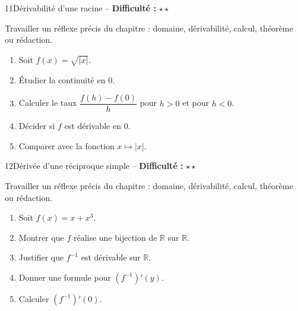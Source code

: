 \documentclass[11pt,a4paper]{article}
\newcommand{\R}{\mathbb{R}}
\newcommand{\etoiles}[1]{\textbf{Difficulté :} #1}
\begin{document}
\begin{exobox}{11}{Dérivabilité d'une racine -- \etoiles{$\star\star$}}

\begin{objectifbox}
Travailler un réflexe précis du chapitre : domaine, dérivabilité, calcul, théorème ou rédaction.
\end{objectifbox}

\begin{enumerate}

\item Soit $f(x)=\sqrt{|x|}$.

\item Étudier la continuité en $0$.

\item Calculer le taux $\dfrac{f(h)-f(0)}{h}$ pour $h>0$ et pour $h<0$.

\item Décider si $f$ est dérivable en $0$.

\item Comparer avec la fonction $x\mapsto |x|$.

\end{enumerate}

\end{exobox}


\begin{exobox}{12}{Dérivée d'une réciproque simple -- \etoiles{$\star\star$}}

\begin{objectifbox}
Travailler un réflexe précis du chapitre : domaine, dérivabilité, calcul, théorème ou rédaction.
\end{objectifbox}

\begin{enumerate}

\item Soit $f(x)=x+x^3$.

\item Montrer que $f$ réalise une bijection de $\R$ sur $\R$.

\item Justifier que $f^{-1}$ est dérivable sur $\R$.

\item Donner une formule pour $(f^{-1})'(y)$.

\item Calculer $(f^{-1})'(0)$.

\end{enumerate}

\end{exobox}
\end{document}

